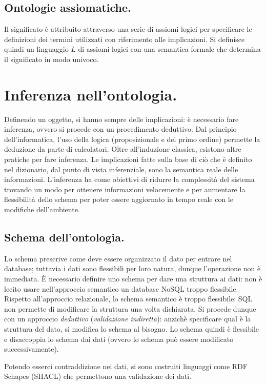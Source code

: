 \documentclass[11pt]{article}
\begin{document}
\begin{multicols}{2}
\subsection{Ontologie assiomatiche.}
Il significato è attribuito attraverso una serie di assiomi logici per specificare le definizioni dei termini utilizzati con riferimento alle implicazioni.
Si definisce quindi un linguaggio $L$ di assiomi logici con una semantica formale che determina il significato in modo univoco.

\section{Inferenza nell'ontologia.}
Definendo un oggetto, si hanno sempre delle implicazioni: è necessario fare inferenza, ovvero si procede con un procedimento deduttivo.
Dal principio dell'informatica, l'uso della logica (proposizionale e del primo ordine) permette la deduzione da parte di calcolatori.
Oltre all'induzione classica, esistono altre pratiche per fare inferenza.
Le implicazioni fatte sulla base di ciò che è definito nel dizionario, dal punto di vista inferenziale, sono la semantica reale delle informazioni.
L'inferenza ha come obiettivi di ridurre la complessità del sistema trovando un modo per ottenere informazioni velocemente e per aumentare la flessibilità dello schema per poter essere aggiornato in tempo reale con le modifiche dell'ambiente.

\subsection{Schema dell'ontologia.}
Lo schema prescrive come deve essere organizzato il dato per entrare nel database; tuttavia i dati sono flessibili per loro natura, dunque l'operazione non è immediata.
È necessario definire uno schema per dare una struttura ai dati: non è lecito usare nell'approccio semantico un database NoSQL troppo flessibile.
Rispetto all'approccio relazionale, lo schema semantico è troppo flessibile: SQL non permette di modificare la struttura una volta dichiarata.
Si procede dunque con un approccio \textit{deduttivo} (\textit{validazione indiretta}): anzichè specificare qual è la struttura del dato, si modifica lo schema al bisogno.
Lo schema quindi è flessibile e disaccoppia lo schema dai dati (ovvero lo schema può essere modificato successivamente).

Potendo esserci contraddizione nei dati, si sono costruiti linguaggi come RDF Schapes (SHACL) che permettono una validazione dei dati.


\end{multicols}
\end{document}
